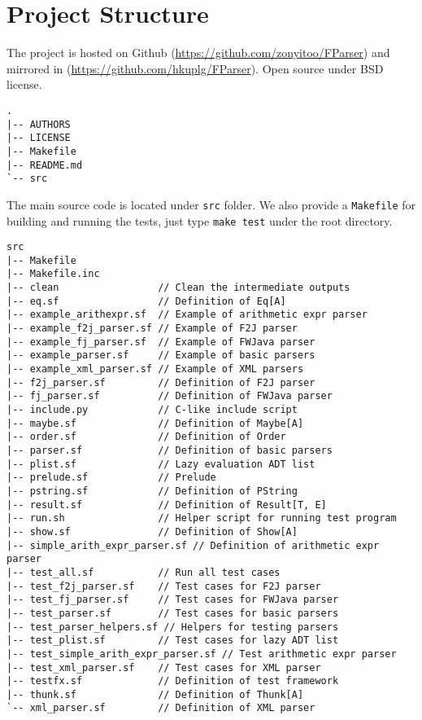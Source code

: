 \section{Project Structure}

The project is hosted on Github (\url{https://github.com/zonyitoo/FParser}) and mirrored in (\url{https://github.com/hkuplg/FParser}). Open source under BSD license.

\begin{lstlisting}[language={}]
.
|-- AUTHORS
|-- LICENSE
|-- Makefile
|-- README.md
`-- src
\end{lstlisting}

The main source code is located under \texttt{src} folder. We also provide a \texttt{Makefile} for building and running the tests, just type \texttt{make test} under the root directory.

\begin{lstlisting}[language={}]
src
|-- Makefile
|-- Makefile.inc
|-- clean                 // Clean the intermediate outputs
|-- eq.sf                 // Definition of Eq[A]
|-- example_arithexpr.sf  // Example of arithmetic expr parser
|-- example_f2j_parser.sf // Example of F2J parser
|-- example_fj_parser.sf  // Example of FWJava parser
|-- example_parser.sf     // Example of basic parsers
|-- example_xml_parser.sf // Example of XML parsers
|-- f2j_parser.sf         // Definition of F2J parser
|-- fj_parser.sf          // Definition of FWJava parser
|-- include.py            // C-like include script
|-- maybe.sf              // Definition of Maybe[A]
|-- order.sf              // Definition of Order
|-- parser.sf             // Definition of basic parsers
|-- plist.sf              // Lazy evaluation ADT list
|-- prelude.sf            // Prelude
|-- pstring.sf            // Definition of PString
|-- result.sf             // Definition of Result[T, E]
|-- run.sh                // Helper script for running test program
|-- show.sf               // Definition of Show[A]
|-- simple_arith_expr_parser.sf // Definition of arithmetic expr parser
|-- test_all.sf           // Run all test cases
|-- test_f2j_parser.sf    // Test cases for F2J parser
|-- test_fj_parser.sf     // Test cases for FWJava parser
|-- test_parser.sf        // Test cases for basic parsers
|-- test_parser_helpers.sf // Helpers for testing parsers
|-- test_plist.sf         // Test cases for lazy ADT list
|-- test_simple_arith_expr_parser.sf // Test arithmetic expr parser
|-- test_xml_parser.sf    // Test cases for XML parser
|-- testfx.sf             // Definition of test framework
|-- thunk.sf              // Definition of Thunk[A]
`-- xml_parser.sf         // Definition of XML parser
\end{lstlisting}

